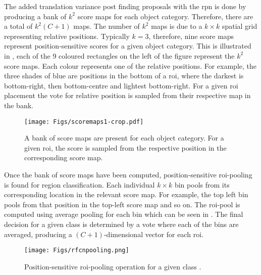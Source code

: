 \documentclass[a4paper,twoside]{article}
\begin{document}
The added translation variance post finding proposals with the \gls{rpn} is done by producing a bank of $k^2$ score maps for each object category. Therefore, there are a total of $k^2(C + 1)$ maps. The number of $k^2$ maps is due to a $k \times k$ spatial grid representing relative positions. Typically $k = 3$, therefore, nine score maps represent position-sensitive scores for a given object category. This is illustrated in , each of the 9 coloured rectangles on the left of the figure represent the $k^2$ score maps. Each colour represents one of the relative positions. For example, the three shades of blue are positions in the bottom of a \gls{roi}, where the darkest is bottom-right, then bottom-centre and lightest bottom-right. For a given \gls{roi} placement the vote for relative position is sampled from their respective map in the bank.

\begin{figure}[H]
  \centering
    \texttt{[image: Figs/scoremaps1-crop.pdf]}
     \caption{A bank of score maps are present for each object category. For a given \gls{roi}, the score is sampled from the respective position in the corresponding score map.}
    \label{fig:scoremaps}
\end{figure}

Once the bank of score maps have been computed, position-sensitive \gls{roi}-pooling is found for region classification. Each individual $k \times k$ bin pools from its corresponding location in the relevant score map. For example, the top left bin pools from that position in the top-left score map and so on. The \gls{roi}-pool is computed using average pooling for each bin which can be seen in . The final decision for a given class is determined by a vote where each of the bins are averaged, producing a $(C+1)$-dimensional vector for each \gls{roi}.

\begin{figure}[H]
  \centering
    \texttt{[image: Figs/rfcnpooling.png]}
      \caption{Position-sensitive \gls{roi}-pooling operation for a given class \cite{rfcn}.}
    \label{fig:rfcnpooling}
\end{figure}
\end{document}
